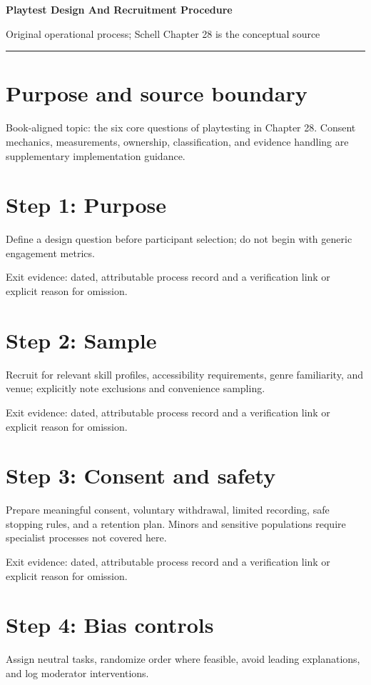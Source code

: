 \documentclass[11pt]{article}
\begin{document}
{\huge\bfseries\color{suiteblue} Playtest Design And Recruitment Procedure}\par
\vspace{0.15in}
{\normalsize\color{suitegray} Original operational process; Schell Chapter 28 is the conceptual source}\par
\vspace{0.15in}\hrule\vspace{0.15in}

\section{Purpose and source boundary}
Book-aligned topic: the six core questions of playtesting in Chapter 28. Consent mechanics, measurements, ownership, classification, and evidence handling are supplementary implementation guidance.


\section{Step 1: Purpose}
Define a design question before participant selection; do not begin with generic engagement metrics.

Exit evidence: dated, attributable process record and a verification link or explicit reason for omission.


\section{Step 2: Sample}
Recruit for relevant skill profiles, accessibility requirements, genre familiarity, and venue; explicitly note exclusions and convenience sampling.

Exit evidence: dated, attributable process record and a verification link or explicit reason for omission.


\section{Step 3: Consent and safety}
Prepare meaningful consent, voluntary withdrawal, limited recording, safe stopping rules, and a retention plan. Minors and sensitive populations require specialist processes not covered here.

Exit evidence: dated, attributable process record and a verification link or explicit reason for omission.


\section{Step 4: Bias controls}
Assign neutral tasks, randomize order where feasible, avoid leading explanations, and log moderator interventions.
\end{document}
